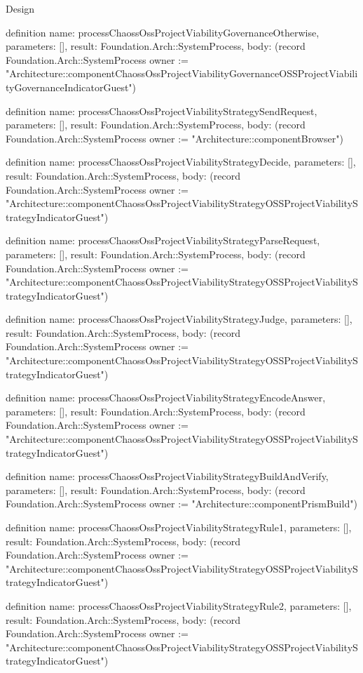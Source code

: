 \begin{lexlean}{Design}
\begin{semanticmodule}
definition{
  name: processChaossOssProjectViabilityGovernanceOtherwise,
  parameters: [],
  result: Foundation.Arch::SystemProcess,
  body: (record Foundation.Arch::SystemProcess {owner := "Architecture::componentChaossOssProjectViabilityGovernanceOSSProjectViabilityGovernanceIndicatorGuest"})
}

definition{
  name: processChaossOssProjectViabilityStrategySendRequest,
  parameters: [],
  result: Foundation.Arch::SystemProcess,
  body: (record Foundation.Arch::SystemProcess {owner := "Architecture::componentBrowser"})
}

definition{
  name: processChaossOssProjectViabilityStrategyDecide,
  parameters: [],
  result: Foundation.Arch::SystemProcess,
  body: (record Foundation.Arch::SystemProcess {owner := "Architecture::componentChaossOssProjectViabilityStrategyOSSProjectViabilityStrategyIndicatorGuest"})
}

definition{
  name: processChaossOssProjectViabilityStrategyParseRequest,
  parameters: [],
  result: Foundation.Arch::SystemProcess,
  body: (record Foundation.Arch::SystemProcess {owner := "Architecture::componentChaossOssProjectViabilityStrategyOSSProjectViabilityStrategyIndicatorGuest"})
}

definition{
  name: processChaossOssProjectViabilityStrategyJudge,
  parameters: [],
  result: Foundation.Arch::SystemProcess,
  body: (record Foundation.Arch::SystemProcess {owner := "Architecture::componentChaossOssProjectViabilityStrategyOSSProjectViabilityStrategyIndicatorGuest"})
}

definition{
  name: processChaossOssProjectViabilityStrategyEncodeAnswer,
  parameters: [],
  result: Foundation.Arch::SystemProcess,
  body: (record Foundation.Arch::SystemProcess {owner := "Architecture::componentChaossOssProjectViabilityStrategyOSSProjectViabilityStrategyIndicatorGuest"})
}

definition{
  name: processChaossOssProjectViabilityStrategyBuildAndVerify,
  parameters: [],
  result: Foundation.Arch::SystemProcess,
  body: (record Foundation.Arch::SystemProcess {owner := "Architecture::componentPrismBuild"})
}

definition{
  name: processChaossOssProjectViabilityStrategyRule1,
  parameters: [],
  result: Foundation.Arch::SystemProcess,
  body: (record Foundation.Arch::SystemProcess {owner := "Architecture::componentChaossOssProjectViabilityStrategyOSSProjectViabilityStrategyIndicatorGuest"})
}

definition{
  name: processChaossOssProjectViabilityStrategyRule2,
  parameters: [],
  result: Foundation.Arch::SystemProcess,
  body: (record Foundation.Arch::SystemProcess {owner := "Architecture::componentChaossOssProjectViabilityStrategyOSSProjectViabilityStrategyIndicatorGuest"})
}


\end{semanticmodule}
\end{lexlean}
